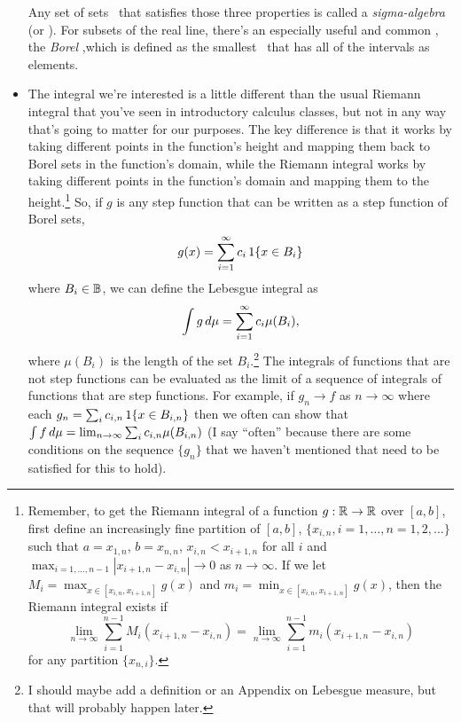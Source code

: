\begin{itemize}[leftmargin=0pt]
  Any set of sets \BB\ that satisfies those three properties is called
  a \emph{sigma-algebra} (or \emph{\sigmaalgebra}).  For subsets of
  the real line, there's an especially useful and common
  \sigmaalgebra, the \emph{Borel \sigmaalgebra},which is defined as
  the smallest \sigmaalgebra\ that has all of the intervals as
  elements.

\item The integral we're interested is a little different than the
  usual Riemann integral that you've seen in introductory calculus
  classes, but not in any way that's going to matter for our purposes.
  The key difference is that it works by taking different points in
  the function's height and mapping them back to Borel sets in the
  function's domain, while the Riemann integral works by taking
  different points in the function's domain and mapping them to the
  height.\footnote{Remember, to get the Riemann integral of a function
  $g: \mathbb{R} \to \mathbb{R}$ over $[a,b]$, first define an increasingly fine
  partition of $[a,b]$, $\{x_{i,n}, i = 1,\dots,n = 1,2,\dots\}$ such that
  $a = x_{1,n}$, $b = x_{n,n}$, $x_{i,n} < x_{i+1,n}$ for all $i$
  and $\max_{i=1,\dots,n-1} |x_{i+1,n} - x_{i,n}| \to 0$ as $n \to \infty$.  If
  we let $M_i = \max_{x \in [x_{i,n}, x_{i+1,n}]} g(x)$ and $m_i =
  \min_{x \in [x_{i,n}, x_{i+1,n}]} g(x)$, then the Riemann integral
  exists if
  \begin{equation*}
    \lim_{n \to \infty} \sum_{i=1}^{n-1} M_i (x_{i+1,n} - x_{i,n})
    = \lim_{n \to \infty} \sum_{i=1}^{n-1} m_i (x_{i+1,n} - x_{i,n})
  \end{equation*}
  for any partition $\{x_{n,i}\}$.} 
  So, if $g$ is any step function that can be written as a step
  function of Borel sets,
  \begin{equation*}
    g(x) = \sum_{i=1}^\infty c_i \operatorname{1}\{x \in B_i\}
  \end{equation*}
  where $B_i \in \mathbb{B}$, we can define the Lebesgue integral as
  \begin{equation*}
    \int g \,d\mu = \sum_{i=1}^\infty c_i \mu(B_i),
  \end{equation*}
  where $\mu(B_i)$ is the length of the set $B_i$.\footnote{I should
  maybe add a definition or an Appendix on Lebesgue measure, but
  that will probably happen later.}  The integrals of functions that
  are not step functions can be evaluated as the limit of a sequence
  of integrals of functions that are step functions.  For example, if
  $g_n \to f$ as $n \to \infty$ where each $g_n = \sum_i c_{i,n}
  \operatorname{1}\{x \in B_{i,n}\}$ then we often can show that $\int f \,d\mu =
  \lim_{n \to \infty} \sum_i c_{i,n} \mu(B_{i,n})$ (I say ``often''
  because there are some conditions on the sequence $\{g_n\}$ that we
  haven't mentioned that need to be satisfied for this to hold).


\end{itemize}
